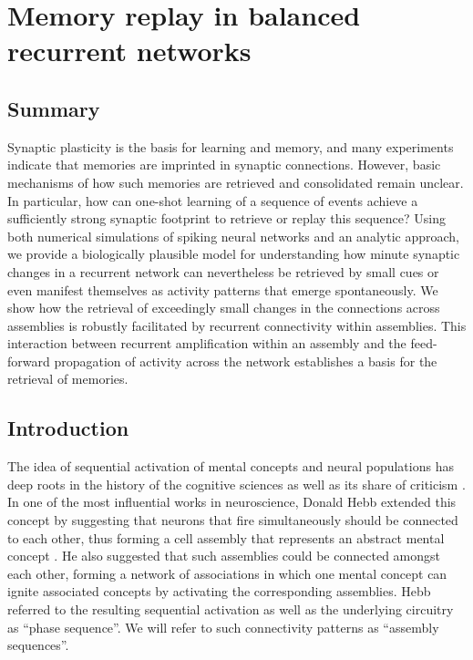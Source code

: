 \chapter{Memory replay in balanced recurrent networks}
\label{chap:asss}

\section{Summary}
  Synaptic plasticity is the basis for learning and memory, and many
  experiments indicate that memories are imprinted in synaptic connections.
  However, basic mechanisms of how such memories are retrieved and consolidated
  remain unclear. In particular, how can one-shot learning of a sequence of
  events achieve a sufficiently strong synaptic footprint to retrieve or replay
  this sequence? Using both numerical simulations of spiking neural networks
  and an analytic approach, we provide a biologically plausible model for
  understanding how minute synaptic changes in a recurrent network can
  nevertheless be retrieved by small cues or even manifest themselves as
  activity patterns that emerge spontaneously. We show how the retrieval of
  exceedingly small changes in the connections across assemblies is robustly
  facilitated by recurrent connectivity within assemblies. This interaction
  between recurrent amplification within an assembly and the feed-forward
  propagation of activity across the network establishes a basis for the
  retrieval of memories.

\section{Introduction}
  The idea of sequential activation of mental concepts and neural populations
  has deep roots in the history of the cognitive sciences \citep{Titchener1909,
  Brown1914, Washburn1916} as well as its share of criticism
  \citep{Lashley1951}. In one of the most influential works in neuroscience,
  Donald Hebb extended this concept by suggesting that neurons that fire
  simultaneously should be connected to each other, thus forming a cell
  assembly that represents an abstract mental concept \citep{Hebb49}. He also
  suggested that such assemblies could be connected amongst each other, forming
  a network of associations in which one mental concept can ignite associated
  concepts by activating the corresponding assemblies. Hebb referred to the
  resulting sequential activation as well as the underlying circuitry as
  ``phase sequence''. We will refer to such connectivity patterns as ``assembly
  sequences''.

